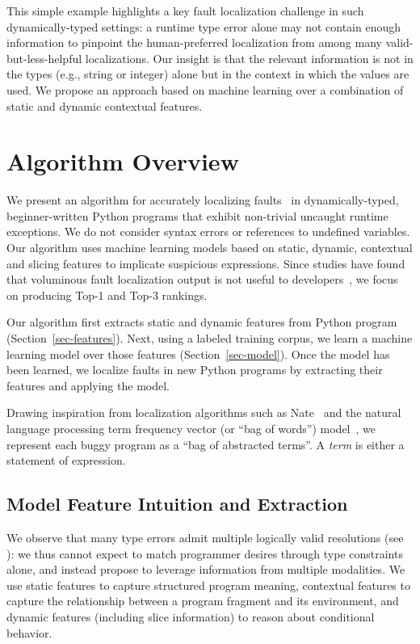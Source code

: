 \documentclass[conference]{IEEEtran}
\begin{document}
This simple example highlights a key fault localization challenge in such
dynamically-typed settings: a runtime type error alone may not contain
enough information to pinpoint the human-preferred localization from among
many valid-but-less-helpful localizations. Our insight is that the relevant
information is not in the types (e.g., string or integer) alone but in the
context in which the values are used.  We propose an approach based on
machine learning over a combination of static and dynamic contextual
features.


\section{Algorithm Overview}

We present an algorithm for accurately localizing faults~\cite{tarantula} in
dynamically-typed, beginner-written Python programs that exhibit
non-trivial uncaught runtime exceptions. We do not consider syntax errors
or references to undefined variables. Our algorithm uses machine learning
models based on static, dynamic, contextual and slicing features to
implicate suspicious expressions. Since studies have found that voluminous
fault localization output is not useful to
developers~\cite{orso-parnin,orso-parnin2015}, we focus on producing Top-1
and Top-3 rankings.

Our algorithm first extracts static and dynamic features from Python
program (Section~\ref{sec-features}). Next, using a labeled training
corpus, we learn a machine learning model over those features
(Section~\ref{sec-model}). Once the model has been learned, we localize
faults in new Python programs by extracting their features and applying the
model.

Drawing inspiration from localization algorithms such as
Nate~\cite{learning-to-blame} and the natural language processing term
frequency vector (or ``bag of words'') model~\cite{FIXME}, we represent
each buggy program as a ``bag of abstracted terms''. A \emph{term} is
either a statement of expression.

\subsection{Model Feature Intuition and Extraction}

We observe that many type errors admit multiple logically valid resolutions
(see ): we thus cannot expect to match programmer desires
through type constraints alone, and instead propose to leverage information
from multiple modalities. We use static features to capture structured
program meaning, contextual features to capture the relationship between a 
program fragment and its environment, and dynamic features (including slice
information) to reason about conditional behavior.
\end{document}
